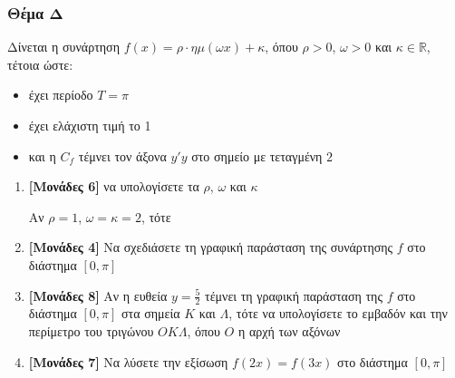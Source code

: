 \documentclass[12pt]{article}
\begin{document}
\section*{Θέμα Δ}
\noindent
Δίνεται η συνάρτηση $f(x)=ρ\cdot ημ(ωx)+κ$, όπου $ρ>0$, $ω>0$ και $κ\in \mathbb{R}$, τέτοια ώστε:
\begin{itemize}
      \item έχει περίοδο $Τ=π$
      \item έχει ελάχιστη τιμή το 1
      \item και η $C_f$ τέμνει τον άξονα $y'y$ στο σημείο με τεταγμένη $2$
\end{itemize}
\begin{enumerate}
      \item \textbf{[Μονάδες 6]} να υπολογίσετε τα $ρ$, $ω$ και $κ$

            Αν $ρ=1$, $ω=κ=2$, τότε

      \item \textbf{[Μονάδες 4]} Να σχεδιάσετε τη γραφική παράσταση της συνάρτησης $f$ στο διάστημα $[0,π]$
      \item \textbf{[Μονάδες 8]} Αν η ευθεία $y=\frac{5}{2}$ τέμνει τη γραφική παράσταση της $f$ στο διάστημα $[0,π]$ στα σημεία $Κ$ και $Λ$, τότε να υπολογίσετε το εμβαδόν και την περίμετρο του τριγώνου $ΟΚΛ$, όπου $Ο$ η αρχή των αξόνων
      \item \textbf{[Μονάδες 7]} Να λύσετε την εξίσωση $f(2x)=f(3x)$ στο διάστημα $[0,π]$
\end{enumerate}

\vspace{3\baselineskip}

\part*{}
\end{document}
